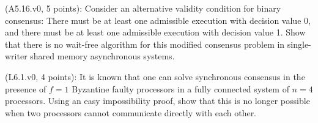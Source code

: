 \begin{Exc}{(A5.16.v0, 5 points):}
Consider an alternative validity condition for binary consensus: There must
be at least one admissible execution with decision value 0, and there
must be at least one admissible execution with decision value 1.
Show that there is no wait-free algorithm for this modified consensus
problem in single-writer shared memory asynchronous systems.
\end{Exc}


\begin{Exc}{(L6.1.v0, 4 points):}
It is known that one can solve synchronous consensus
in the presence of $f=1$ Byzantine faulty processors
in a fully connected system of $n=4$ processors. Using an easy
impossibility proof, show that this is no longer possible when
two processors cannot communicate directly with each other.
\end{Exc}


